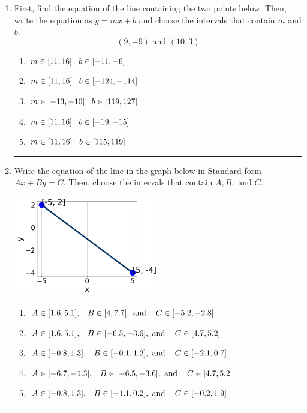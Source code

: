 \documentclass[14pt]{extbook}
\newcommand{\litem}[1]{\item#1\hspace*{-1cm}\rule{\textwidth}{0.4pt}}
\begin{document}
\begin{enumerate}
\litem{
First, find the equation of the line containing the two points below. Then, write the equation as $ y=mx+b $ and choose the intervals that contain $m$ and $b$.\[ (9, -9) \text{ and } (10, 3) \]\begin{enumerate}[label=\Alph*.]
\item \( m \in [11, 16] \hspace*{3mm} b \in [-11, -6] \)
\item \( m \in [11, 16] \hspace*{3mm} b \in [-124, -114] \)
\item \( m \in [-13, -10] \hspace*{3mm} b \in [119, 127] \)
\item \( m \in [11, 16] \hspace*{3mm} b \in [-19, -15] \)
\item \( m \in [11, 16] \hspace*{3mm} b \in [115, 119] \)

\end{enumerate} }
\litem{
Write the equation of the line in the graph below in Standard form $Ax+By=C$. Then, choose the intervals that contain $A, B, \text{ and } C$.
\begin{center}
    \includegraphics[width=0.5\textwidth]{../Figures/linearGraphToStandardCopyB.png}
\end{center}
\begin{enumerate}[label=\Alph*.]
\item \( A \in [1.6, 5.1], \hspace{3mm} B \in [4, 7.7], \text{ and } \hspace{3mm} C \in [-5.2, -2.8] \)
\item \( A \in [1.6, 5.1], \hspace{3mm} B \in [-6.5, -3.6], \text{ and } \hspace{3mm} C \in [4.7, 5.2] \)
\item \( A \in [-0.8, 1.3], \hspace{3mm} B \in [-0.1, 1.2], \text{ and } \hspace{3mm} C \in [-2.1, 0.7] \)
\item \( A \in [-6.7, -1.3], \hspace{3mm} B \in [-6.5, -3.6], \text{ and } \hspace{3mm} C \in [4.7, 5.2] \)
\item \( A \in [-0.8, 1.3], \hspace{3mm} B \in [-1.1, 0.2], \text{ and } \hspace{3mm} C \in [-0.2, 1.9] \)


\end{enumerate}}
\end{enumerate}
\end{document}
